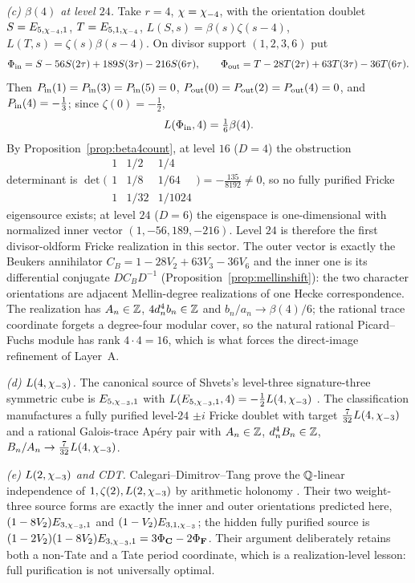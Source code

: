 \emph{(c) $\beta(4)$ at level $24$.}  Take $r=4$, $\chi=\chi_{-4}$, with the
orientation doublet $S=E_{5,\chi_{-4},1}$, $T=E_{5,1,\chi_{-4}}$,
$L(S,s)=\beta(s)\zeta(s-4)$, $L(T,s)=\zeta(s)\beta(s-4)$.  On divisor support
$(1,2,3,6)$ put
\[
\Phi_{\rm in}=S-56S(2\tau)+189S(3\tau)-216S(6\tau),\qquad
\Phi_{\rm out}=T-28T(2\tau)+63T(3\tau)-36T(6\tau).
\]
Then $P_{\rm in}(1)=P_{\rm in}(3)=P_{\rm in}(5)=0$,
$P_{\rm out}(0)=P_{\rm out}(2)=P_{\rm out}(4)=0$, and $P_{\rm in}(4)=-\tfrac13$;
since $\zeta(0)=-\tfrac12$,
\begin{equation}\label{eq:beta4target}
L(\Phi_{\rm in},4)=\tfrac16\beta(4).
\end{equation}
By Proposition~\ref{prop:beta4count}, at level $16$ ($D=4$) the obstruction
determinant is $\det\bigl(\begin{smallmatrix}1&1/2&1/4\\1&1/8&1/64\\
1&1/32&1/1024\end{smallmatrix}\bigr)=-\tfrac{135}{8192}\neq0$, so no fully
purified Fricke eigensource exists; at level $24$ ($D=6$) the eigenspace is
one-dimensional with normalized inner vector $(1,-56,189,-216)$.  Level $24$
is therefore the first divisor-oldform Fricke realization in this sector.  The
outer vector is exactly the Beukers annihilator
$C_B=1-28V_2+63V_3-36V_6$ and the inner one is its differential conjugate
$DC_BD^{-1}$ (Proposition~\ref{prop:mellinshift}): the two character
orientations are adjacent Mellin-degree realizations of one Hecke
correspondence.  The realization has $A_n\in\mathbb{Z}$, $4d_n^4b_n\in\mathbb{Z}$ and
$b_n/a_n\to\beta(4)/6$; the rational trace coordinate forgets a degree-four
modular cover, so the natural rational Picard--Fuchs module has rank
$4\cdot4=16$, which is what forces the direct-image refinement of Layer~A.

\emph{(d) $L(4,\chi_{-3})$.}  The canonical source of Shvets's level-three
signature-three symmetric cube is $E_{5,\chi_{-3},1}$ with
$L(E_{5,\chi_{-3},1},4)=-\tfrac12L(4,\chi_{-3})$ \cite{Shvets2026cube}.  The
classification manufactures a fully purified level-$24$ $\pm i$ Fricke doublet
with target $\tfrac7{32}L(4,\chi_{-3})$ and a rational Galois-trace Ap\'ery pair
with $A_n\in\mathbb{Z}$, $d_n^4B_n\in\mathbb{Z}$, $B_n/A_n\to\tfrac7{32}L(4,\chi_{-3})$.

\emph{(e) $L(2,\chi_{-3})$ and CDT.}  Calegari--Dimitrov--Tang prove the
$\mathbb{Q}$-linear independence of $1,\zeta(2),L(2,\chi_{-3})$ by arithmetic holonomy
\cite{CDT2024}.  Their two weight-three source forms are exactly the inner and
outer orientations predicted here, $(1-8V_2)E_{3,\chi_{-3},1}$ and
$(1-V_2)E_{3,1,\chi_{-3}}$; the hidden fully purified source is
$(1-2V_2)(1-8V_2)E_{3,\chi_{-3},1}=3\Phi_{\mathbf C}-2\Phi_{\mathbf F}$.  Their
argument deliberately retains both a non-Tate and a Tate period coordinate,
which is a realization-level lesson: full purification is not universally
optimal.

